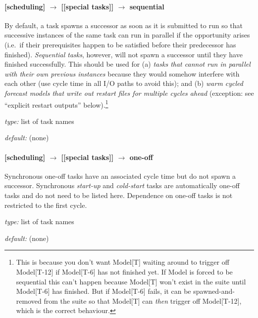 \paragraph[sequential]{[scheduling] $\rightarrow$ [[special tasks]] $\rightarrow$ sequential}

By default, a task spawns a successor as soon as it is submitted to run
so that successive instances of the same task can run in parallel if the
opportunity arises (i.e.\ if their prerequisites happen to be satisfied
before their predecessor has finished). {\em Sequential tasks}, however,
will not spawn a successor until they have finished successfully. This
should be used for (a) {\em tasks that cannot run in parallel with their
own previous instances} because they would somehow interfere with each
other (use cycle time in all I/O paths to avoid this); and (b) {\em warm
cycled forecast models that write out restart files for multiple cycles
ahead} (exception: see ``explicit restart outputs''
below).\footnote{This is because you don't want Model[T] waiting around
to trigger off Model[T-12] if Model[T-6] has not finished yet. If Model
is forced to be sequential this can't happen because Model[T] won't
exist in the suite until Model[T-6] has finished. But if Model[T-6]
fails, it can be spawned-and-removed from the suite so that Model[T] can
{\em then} trigger off Model[T-12], which is the correct behaviour.} 

\begin{myitemize}
    \item {\em type:} list of task names
    \item {\em default:} (none)
\end{myitemize}

\paragraph[one-off]{[scheduling] $\rightarrow$ [[special tasks]] $\rightarrow$ one-off}

Synchronous one-off tasks have an associated cycle time but do not spawn
a successor. Synchronous {\em start-up} and {\em cold-start} tasks are
automatically one-off tasks and do not need to be listed here.
Dependence on one-off tasks is not restricted to the first cycle.

\begin{myitemize}
\item {\em type:} list of task names
\item {\em default:} (none)
\end{myitemize}

